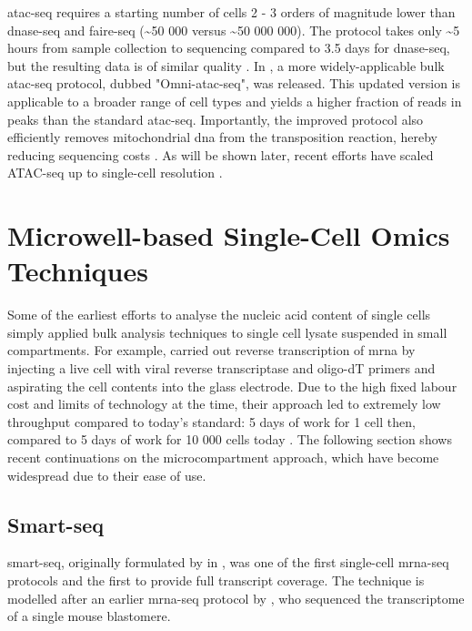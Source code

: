 \acrshort{atac-seq} requires a starting number of cells 2 - 3 orders of magnitude lower than \acrshort{dnase-seq}  and \acrshort{faire-seq} ({\textasciitilde}50 000 versus {\textasciitilde}50 000 000). The protocol takes only {\textasciitilde}5 hours from sample collection to sequencing compared to 3.5 days for \acrshort{dnase-seq}, but the resulting data is of similar quality \citep{buenrostro2013}. In \citeyear{corces2017}, a more widely-applicable bulk \acrshort{atac-seq} protocol, dubbed "Omni-\acrshort{atac-seq}", was released. This updated version is applicable to a broader range of cell types and yields a higher fraction of reads in peaks than the standard \acrshort{atac-seq}. Importantly, the improved protocol also efficiently removes mitochondrial \acrshort{dna} from the transposition reaction, hereby reducing sequencing costs \citep{corces2017}. As will be shown later, recent efforts have scaled ATAC-seq up to single-cell resolution \citep{buenrostro2015, chen2018}.\pms

\newpage
\section{Microwell-based Single-Cell Omics Techniques}
\label{sec:lit_well-based}
Some of the earliest efforts to analyse the nucleic acid content of single cells simply applied bulk analysis techniques to single cell lysate suspended in small compartments. For example, \citeauthor{eberwine1992} carried out reverse transcription of \acrshort{mrna} by injecting a live cell with viral reverse transcriptase and oligo-dT primers and aspirating the cell contents into the glass electrode. Due to the high fixed labour cost and limits of technology at the time, their approach led to extremely low throughput compared to today's standard: 5 days of work for 1 cell then, compared to 5 days of work for 10 000 cells today \citep{hashimshony2012}. The following section shows recent continuations on the microcompartment approach, which have become widespread due to their ease of use.\pms

\subsection{Smart-seq}
\label{subsect:lit_smart-seq}
\Acrfull{smart-seq}, originally formulated by \citeauthor{ramskold2012} in \citeyear{ramskold2012}, was one of the first single-cell \acrshort{mrna}-seq protocols and the first to provide full transcript coverage. The technique is modelled after an earlier \acrshort{mrna}-seq protocol by \cite{tang2009}, who sequenced the transcriptome of a single mouse blastomere.\pms

